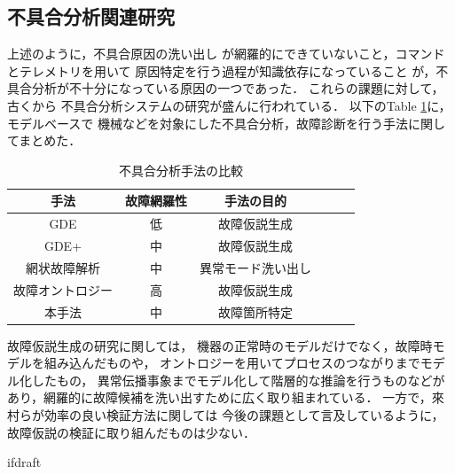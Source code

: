 \documentclass[11pt]{article}
\begin{document}


\subsection{不具合分析関連研究}
上述のように，不具合原因の洗い出し
が網羅的にできていないこと，コマンドとテレメトリを用いて
原因特定を行う過程が知識依存になっていること
が，不具合分析が不十分になっている原因の一つであった．%
これらの課題に対して，古くから%
不具合分析システムの研究が盛んに行われている．
以下のTable \ref{tab:previous_research}に，モデルベースで
機械などを対象にした不具合分析，故障診断を行う手法に関してまとめた．
\begin{table}[H]
   \centering
   \caption{不具合分析手法の比較}
   \label{tab:previous_research}
      \begin{tabular}{cccccc} \hline%
         手法&故障網羅性&手法の目的%
         \\ \hline
         GDE&低&故障仮説生成%
         \\ %
         GDE+\cite{Struss1989}&中&故障仮説生成%
         \\
         網状故障解析\cite{Yamaguchi2014}&中&異常モード洗い出し%
         \\
         故障オントロジー\cite{Kitamura1999}&高&故障仮説生成%
         \\
         本手法&中&故障箇所特定%
         \\ \hline
      \end{tabular}
\end{table}
故障仮説生成の研究に関しては，
機器の正常時のモデルだけでなく，故障時モデルを組み込んだもの\cite{Struss1989}や，
オントロジーを用いてプロセスのつながりまでモデル化したもの\cite{Yamaguchi2014}，
異常伝播事象までモデル化して階層的な推論を行うもの\cite{Kitamura1999}などが
あり，網羅的に故障候補を洗い出すために広く取り組まれている．
一方で，來村ら\cite{Kitamura1999}が効率の良い検証方法に関しては
今後の課題として言及しているように，故障仮説の検証に取り組んだものは少ない．


\expandafter\ifx\csname ifdraft\endcsname\relax
\end{document}
